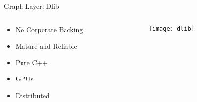 \begin{slide}{Graph Layer: Dlib}
  \begin{columns}
    \begin{column}{0.5\textwidth}
      \begin{itemize}
        \item No Corporate Backing
        \item Mature and Reliable
        \item Pure C++ \cmark
        \item GPUs \cmark
        \item Distributed \xmark
      \end{itemize}
    \end{column}
    \begin{column}{0.45\textwidth}
      \texttt{[image: dlib]}
    \end{column}
  \end{columns}
\end{slide}

%
%
